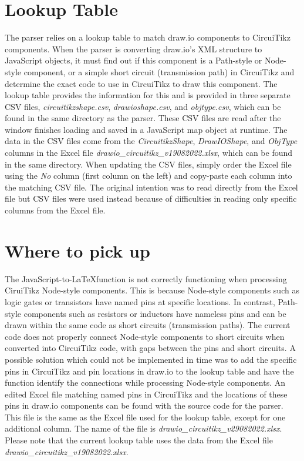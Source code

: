 \section{Lookup Table}\label{sec:parser-lookup-table}
The parser relies on a lookup table to match draw.io components to CircuiTikz components. When the parser is converting draw.io's XML structure to JavaScript objects, it must find out if this component is a Path-style or Node-style component, or a simple short circuit (transmission path) in CircuiTikz and determine the exact code to use in CircuiTikz to draw this component. The lookup table provides the information for this and is provided in three separate CSV files, \emph{circuitikzshape.csv}, \emph{drawioshape.csv}, and \emph{objtype.csv}, which can be found in the same directory as the parser. These CSV files are read after the window finishes loading and saved in a JavaScript map object at runtime.
The data in the CSV files come from the \emph{CircuitikzShape}, \emph{DrawIOShape}, and \emph{ObjType} columns in the Excel file \emph{drawio\_circuitikz\_v19082022.xlsx}, which can be found in the same directory. When updating the CSV files, simply order the Excel file using the \emph{No} column (first column on the left) and copy-paste each column into the matching CSV file. The original intention was to read directly from the Excel file but CSV files were used instead because of difficulties in reading only specific columns from the Excel file.

\section{Where to pick up}\label{sec:pick-up}
The JavaScript-to-\LaTeX function is not correctly functioning when processing CiruiTikz Node-style components. This is because Node-style components such as logic gates or transistors have named pins at specific locations. In contrast, Path-style components such as resistors or inductors have nameless pins and can be drawn within the same code as short circuits (transmission paths). The current code does not properly connect Node-style components to short circuits when converted into CircuiTikz code, with gaps between the pins and short circuits. A possible solution which could not be implemented in time was to add the specific pins in CircuiTikz and pin locations in draw.io to the lookup table and have the function identify the connections while processing Node-style components.
An edited Excel file matching named pins in CircuiTikz and the locations of these pins in draw.io components can be found with the source code for the parser. This file is the same as the Excel file used for the lookup table, except for one additional column. The name of the file is \emph{drawio\_circuitikz\_v29082022.xlsx}. Please note that the current lookup table uses the data from the Excel file \emph{drawio\_circuitikz\_v19082022.xlsx}.

